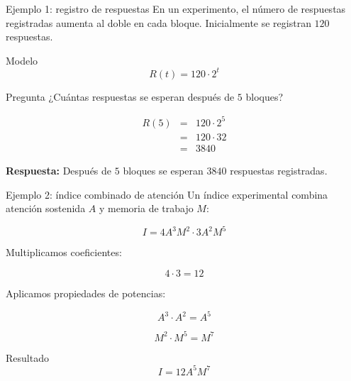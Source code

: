 \documentclass[aspectratio=169]{beamer}
\begin{document}
	\begin{frame}{Ejemplo 1: registro de respuestas}
		En un experimento, el número de respuestas registradas aumenta al doble en cada bloque.  
		Inicialmente se registran \(120\) respuestas.
		
		\pause
		
		\begin{block}{Modelo}
			\[
			R(t)=120\cdot2^t
			\]
		\end{block}
		
		\pause
		
		\begin{exampleblock}{Pregunta}
			¿Cuántas respuestas se esperan después de \(5\) bloques?
		\end{exampleblock}
		
		\pause
		
	\[
	\begin{array}{rcl}
		R(5) & = & 120\cdot 2^5 \\[0.3cm]
		& = & 120\cdot 32 \\[0.3cm]
		& = & 3840
	\end{array}
	\]
		
		\pause
		
		\textbf{Respuesta:} 
			Después de \(5\) bloques se esperan \(3840\) respuestas registradas.
	\end{frame}
	
	
	\begin{frame}{Ejemplo 2: índice combinado de atención}
		Un índice experimental combina atención sostenida \(A\) y memoria de trabajo \(M\):
		
		\[
		I=4A^3M^2\cdot3A^2M^5
		\]
		
		\pause
		
		Multiplicamos coeficientes:
		
		\[
		4\cdot3=12
		\]
		
		\pause
		
		Aplicamos propiedades de potencias:
		
		\[
		A^3\cdot A^2=A^5
		\]
		
		\[
		M^2\cdot M^5=M^7
		\]
		
		\pause
		
		\begin{block}{Resultado}
			\[
			I=12A^5M^7
			\]
		\end{block}
	\end{frame}
	
	
\end{document}
